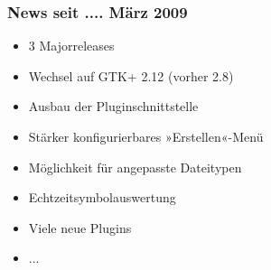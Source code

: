 \begin{frame}
	\frametitle{News seit .... März 2009}
	\begin{block}{}
		\begin{itemize}
			\item 3 Majorreleases
			\item Wechsel auf GTK+ 2.12 (vorher 2.8)
			\item Ausbau der Pluginschnittstelle
			\item Stärker konfigurierbares »Erstellen«-Menü
			\item Möglichkeit für angepasste Dateitypen
			\item Echtzeitsymbolauswertung
			\item Viele neue Plugins
			\item ...
		\end{itemize}
	\end{block}
\end{frame}
